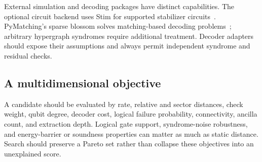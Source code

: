 External simulation and decoding packages have distinct capabilities.
The optional circuit backend uses Stim for supported stabilizer
circuits~\cite{gidney2021}.
PyMatching's sparse blossom solves matching-based decoding
problems~\cite{higgott2025}; arbitrary hypergraph syndromes require
additional treatment. Decoder adapters should expose their assumptions
and always permit independent syndrome and residual checks.

\subsection{A multidimensional objective}
A candidate should be evaluated by rate, relative and sector distances,
check weight, qubit degree, decoder cost, logical failure probability,
connectivity, ancilla count, and extraction depth. Logical gate support,
syndrome-noise robustness, and energy-barrier or soundness properties can
matter as much as static distance. Search should preserve a Pareto set
rather than collapse these objectives into an unexplained score.
